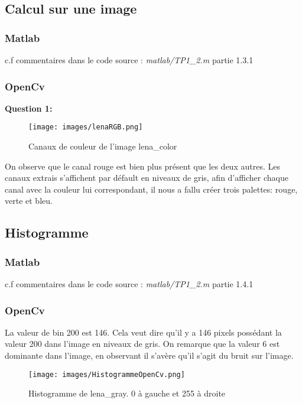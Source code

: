 \documentclass{article}
\begin{document}
  
  \subsection{Calcul sur une image}
  \subsubsection{Matlab}
  c.f commentaires dans le code source : \emph{matlab/TP1\_2.m} partie 1.3.1
  
  \subsubsection{OpenCv}
   \textbf{Question 1:}
      \begin{figure}[h!]
    \begin{center}
	  \texttt{[image: images/lenaRGB.png]}
	\end{center}
	\caption{Canaux de couleur de l'image lena\_color}
  \end{figure}
 
 On observe que le canal rouge est bien plus présent que les deux autres. Les canaux extrais s'affichent par défault en niveaux de gris, afin d'afficher chaque canal avec la couleur lui correspondant, il nous a fallu créer trois palettes: rouge, verte et bleu.
  
  
  \subsection{Histogramme}
  \subsubsection{Matlab}
  c.f commentaires dans le code source : \emph{matlab/TP1\_2.m} partie 1.4.1
  
  \subsubsection{OpenCv}
  La valeur de bin 200 est 146. Cela veut dire qu'il y a 146 pixels possédant la valeur 200 dans l'image en niveaux de gris. On remarque que la valeur 6 est dominante dans l'image, en observant il s'avère qu'il s'agit du bruit sur l'image.
   \begin{figure}[h]
    \begin{center}
	  \texttt{[image: images/HistogrammeOpenCv.png]}
	\end{center}
	\caption{Histogramme de lena\_gray. 0 à gauche et 255 à droite}
  \end{figure}

  

 
\end{document}
